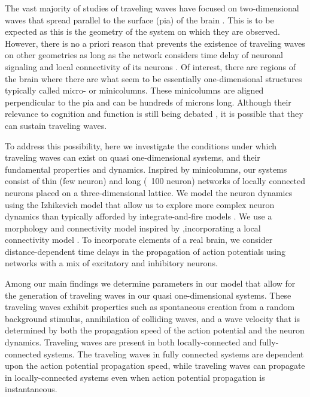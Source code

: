 \documentclass[12pt]{article}
\begin{document}
The vast majority of studies of traveling waves have focused on two-dimensional waves that spread parallel to the surface (pia) of the brain \color{red}\parencite{Wilson1973}\color{black}\parencite{reimer2010}\parencite{keane2015}\color{red}\cite{Townsend2018}\parencite{Golomb1997}\color{black}. 
This is to be expected as this is the geometry of the system on which they are observed. 
However, there is no a priori reason that prevents the existence of traveling waves on other geometries as long as the network considers time delay of neuronal signaling and local connectivity of its neurons \parencite{ermentrout2001}\parencite{Senk2020}. 
Of interest, there are regions of the brain where there are what seem to be essentially one-dimensional structures \parencite{buxhoeveden2002}\parencite{mountcastle1997} typically called micro- or minicolumns. 
These minicolumns are aligned perpendicular to the pia and can be hundreds of microns long.  
Although their relevance to cognition and function is still being debated \parencite{horton2005}\parencite{Cruz2009}\parencite{DaCosta2010}\parencite{buxhoeveden2002}, it is possible that they can sustain traveling waves.

To address this possibility, here we investigate the conditions under which traveling waves can exist on quasi one-dimensional systems, and their fundamental properties and dynamics.  
Inspired by minicolumns, our systems consist of thin (few neuron) and long (~100 neuron) networks of locally connected neurons placed on a three-dimensional lattice.  
We model the neuron dynamics using the Izhikevich model \parencite{izhikevich2003} that allow us to explore more complex neuron dynamics than typically afforded by integrate-and-fire models \parencite{keane2015}\parencite{Senk2020}.
\color{red}We use a morphology and connectivity model inspired by \parencite{maass2002},incorporating a local connectivity model \parencite{Levy2012}\parencite{Pyle2017}\parencite{Fino2011}\color{black}.
To incorporate elements of a real brain, we consider distance-dependent time delays in the propagation of action potentials using networks with a mix of excitatory and inhibitory neurons.

Among our main findings we determine parameters in our model that allow for the generation of traveling waves in our quasi one-dimensional systems. 
These traveling waves exhibit properties such as spontaneous creation from a random background stimulus, annihilation of colliding waves, and a wave velocity that is determined by both the propagation speed of the action potential and the neuron dynamics.
Traveling waves are present in both locally-connected and fully-connected systems. 
The traveling waves in fully connected systems are dependent upon the action potential propagation speed, while traveling waves can propagate in locally-connected systems even when action potential propagation is instantaneous.
\end{document}
